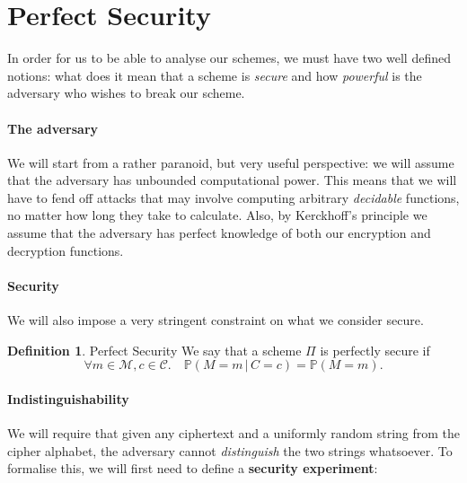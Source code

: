 \documentclass{article}
\theoremstyle{definition}
\newtheorem{definition}{Definition}[section]
\theoremstyle{example}
\newcommand{\M}{\mathcal{M}}
\renewcommand{\C}{\mathcal{C}}
\newcommand{\Prob}{\mathbb{P}}
\begin{document}
\section{Perfect Security}
In order for us to be able to analyse our schemes, we must have two well defined
notions: what does it mean that a scheme is \textit{secure} and how \textit{powerful} is
the adversary who wishes to break our scheme.
\paragraph{The adversary} We will start from a rather
paranoid, but very useful perspective: we will assume that the adversary has
unbounded computational power. This means that we will have to fend off attacks
that may involve computing arbitrary \textit{decidable} functions, no matter how
long they take to calculate. Also, by Kerckhoff's principle we assume that the
adversary has perfect knowledge of both our encryption and decryption functions.
\paragraph{Security} We will also impose a very stringent constraint on what we
consider secure.
\begin{definition}{Perfect Security}
  \label{def:perfect_security}
We say that a scheme $\Pi$ is perfectly secure if
\[
  \forall m \in \M, c \in \C.\quad \Prob(M=m \,|\, C=c) = \Prob(M=m).
\]
\end{definition}
\paragraph{Indistinguishability} We will require that given any ciphertext and a uniformly
random string from the cipher alphabet, the adversary cannot
\textit{distinguish} the two strings whatsoever. To formalise this, we will
first need to define a \textbf{security experiment}:
\end{document}
